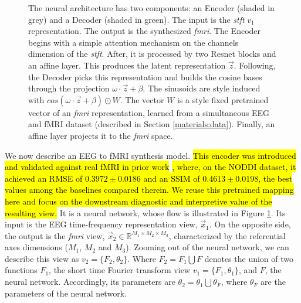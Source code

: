 \documentclass{article}
\begin{document}
\begin{figure}[!t]
\begin{tikzpicture}
    \end{tikzpicture}
    \caption{The neural architecture has two components: an Encoder (shaded in grey) and a Decoder (shaded in green). The input is the \textit{stft} $v_1$ representation. The output is the synthesized \textit{fmri}. The Encoder begins with a simple attention mechanism on the channels dimension of the \textit{stft}. After, it is processed by two Resnet blocks and an affine layer. This produces the latent representation $\vec{z}$. Following, the Decoder picks this representation and builds the cosine bases through the projection $\omega \cdot \vec{z} + \beta$. The sinusoids are style induced with $cos(\omega \cdot \vec{z} + \beta)\odot W$. The vector $W$ is a style fixed pretrained vector of an \textit{fmri} representation, learned from a simultaneous EEG and fMRI dataset (described in Section \ref{materials:data}). Finally, an affine layer projects it to the \textit{fmri} space.}
    \label{fig:horizontal_architecture}
\end{figure}

We now describe an EEG to fMRI synthesis model. \hl{This encoder was introduced and validated against real fMRI in prior work }\cite{calhas2022eeg}\hl{, where, on the NODDI dataset, it achieved an RMSE of $0.3972\pm0.0186$ and an SSIM of $0.4613\pm0.0198$, the best values among the baselines compared therein. We reuse this pretrained mapping here and focus on the downstream diagnostic and interpretive value of the resulting view.} It is a neural network, whose flow is illustrated in Figure \ref{fig:horizontal_architecture}. Its input is the EEG time-frequency representation view, $\vec{x}_1$. On the opposite side, the output is the \textit{fmri} view, $\vec{x}_2 \in \mathbb{R}^{M_1 \times M_2 \times M_3}$, characterized by the referential axes dimensions ($M_1$, $M_2$ and $M_3$). Zooming out of the neural network, we can describe this view as $v_2 = \{ F_2, \theta_2\}$. Where $F_2 = F_1 \bigcup F$ denotes the union of two functions $F_1$, the short time Fourier transform view $v_1 = \{ F_1, \theta_1\}$, and $F$, the neural network. Accordingly, its parameters are $\theta_2 = \theta_1 \bigcup \theta_F$, where $\theta_F$ are the parameters of the neural network. 
\end{document}
